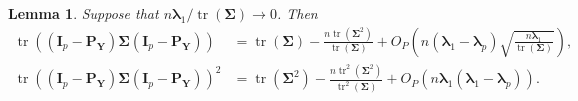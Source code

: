 \documentclass[10pt]{book}
\newtheorem{lemma}{Lemma}
\theoremstyle{definition}
\DeclareMathOperator{\mytr}{tr}
\newcommand{\bP}{\mathbf{P}}
\newcommand{\bY}{\mathbf{Y}}
\newcommand{\bI}{\mathbf{I}}
\newcommand{\bfsym}[1]{\ensuremath{\boldsymbol{#1}}}
\def\blambda {\bfsym {\lambda}}
\def\bSigma {\bfsym {\Sigma}}
\begin{document}
\begin{lemma}
    \label{fenLemma1}
    Suppose that $n\blambda_1/\mytr(\bSigma)\to 0$.
    Then
    \begin{equation*}
        \begin{aligned}
        \mytr \left( (\bI_p-\bP_{\bY})\bSigma (\bI_p-\bP_{\bY})\right)&=
        \mytr(\bSigma)-\frac{n\mytr(\bSigma^2)}{\mytr(\bSigma)}
        +O_P\left(n(\blambda_1-\blambda_p)\sqrt{\frac{n\blambda_1}{\mytr(\bSigma)}}\right)
        ,
        \\
        \mytr \left( (\bI_p-\bP_{\bY})\bSigma (\bI_p-\bP_{\bY})\right)^2&=
        \mytr(\bSigma^2)-\frac{n\mytr^2 (\bSigma^2)}{\mytr^2(\bSigma)}+O_P(n\blambda_1(\blambda_1-\blambda_p)).
        \end{aligned}
    \end{equation*}
\end{lemma}
\end{document}
